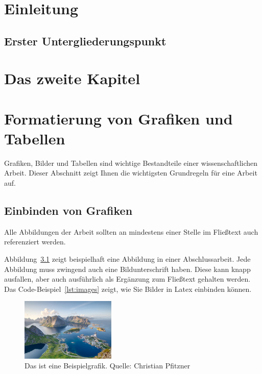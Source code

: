 %
%



\chapter{Einleitung}
\section{Erster Untergliederungspunkt}
\blindtext

\chapter{Das zweite Kapitel}
\blindtext

\chapter{Formatierung von Grafiken und Tabellen}
Grafiken, Bilder und Tabellen sind wichtige Bestandteile einer wissenschaftlichen Arbeit. Dieser Abschnitt zeigt Ihnen die wichtigsten Grundregeln für eine Arbeit auf. 


\section{Einbinden von Grafiken}
Alle Abbildungen der Arbeit sollten an mindestens einer Stelle im Fließtext auch referenziert werden. 


Abbildung~\ref{fig:example} zeigt beispielhaft eine Abbildung in einer Abschlussarbeit. Jede Abbildung muss zwingend auch eine Bildunterschrift haben. Diese kann knapp ausfallen, aber auch ausführlich als Ergänzung zum Fließtext gehalten werden. Das Code-Beispiel~\ref{lst:images} zeigt, wie Sie Bilder in Latex einbinden können. 
\begin{figure}
\centering
  \label{fig:example}
  \includegraphics[width=0.4\textwidth]{02_images/example_image_1}
  \caption{Das ist eine Beispielgrafik. Quelle: Christian Pfitzner }
\end{figure}

